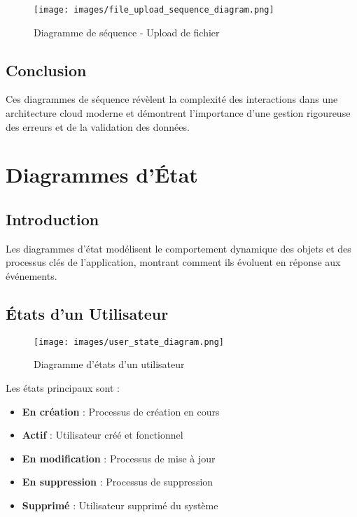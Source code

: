 \begin{figure}[H]
    \centering
    \texttt{[image: images/file\_upload\_sequence\_diagram.png]}
    \caption{Diagramme de séquence - Upload de fichier}
    \label{fig:file_upload_sequence}
\end{figure}

\subsection{Conclusion}

Ces diagrammes de séquence révèlent la complexité des interactions dans une architecture cloud moderne et démontrent l'importance d'une gestion rigoureuse des erreurs et de la validation des données.

\section{Diagrammes d'État}

\subsection{Introduction}

Les diagrammes d'état modélisent le comportement dynamique des objets et des processus clés de l'application, montrant comment ils évoluent en réponse aux événements.

\subsection{États d'un Utilisateur}

\begin{figure}[H]
    \centering
    \texttt{[image: images/user\_state\_diagram.png]}
    \caption{Diagramme d'états d'un utilisateur}
    \label{fig:user_state}
\end{figure}

Les états principaux sont :
\begin{itemize}
    \item \textbf{En création} : Processus de création en cours
    \item \textbf{Actif} : Utilisateur créé et fonctionnel
    \item \textbf{En modification} : Processus de mise à jour
    \item \textbf{En suppression} : Processus de suppression
    \item \textbf{Supprimé} : Utilisateur supprimé du système
\end{itemize}

